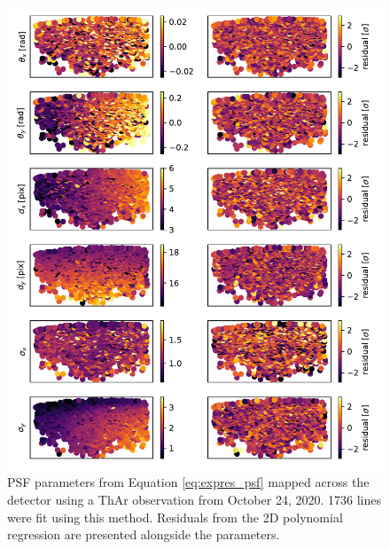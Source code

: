 \begin{figure}
    \centering
    \includegraphics[width=\textwidth]{figures-5/psf-params-2d.pdf}
    \caption[EXPRES two-dimensional point spread function model parameters]{PSF parameters from Equation \ref{eq:expres_psf} mapped across the detector using a ThAr observation from October 24, 2020. 1736 lines were fit using this method. Residuals from the 2D polynomial regression are presented alongside the parameters.}
    \label{fig:psf-params-2d}
\end{figure}

